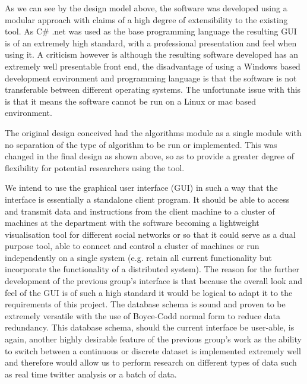 As we can see by the design model above, the software was developed using a modular approach with claims of a high degree of extensibility to the existing tool. As C\# .net was used as the base programming language the resulting GUI is of an extremely high standard, with a professional presentation and feel when using it. A criticism however is although the resulting software developed has an extremely well presentable front end, the disadvantage of using a Windows based development environment and programming language is that the software is not transferable between different operating systems. The unfortunate issue with this is that it means the software cannot be run on a Linux or mac based environment. 

 The original design conceived had the algorithms module as a single module with no separation of the type of algorithm to be run or implemented. This was changed in the final design as shown above, so as to provide a greater degree of flexibility for potential researchers using the tool. 

We intend to use the graphical user interface (GUI) in such a way that the interface is essentially a standalone client program. It should be able to access and transmit data and instructions from the client machine to a cluster of machines at the department with the software becoming a lightweight visualisation tool for different social networks or so that it could serve as a dual purpose tool, able to connect and control a cluster of machines or run independently on a single system (e.g. retain all current functionality but incorporate the functionality of a distributed system). The reason for the further development of the previous group's interface is that because the overall look and feel of the GUI is of such a high standard it would be logical to adapt it to the requirements of this project. The database schema is sound and proven to be extremely versatile with the use of Boyce-Codd normal form to reduce data redundancy. This database schema, should the current interface be user-able, is again, another highly desirable  feature of the previous group's work as the ability to switch between a continuous or discrete dataset is implemented extremely well and therefore would allow us to perform research on different types of data such as real time twitter analysis or a batch of data.

